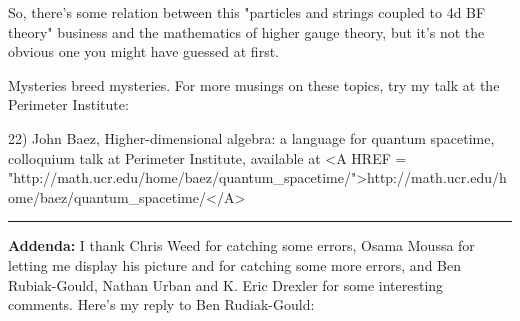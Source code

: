 So, there's some relation between this "particles and strings
coupled to 4d BF theory" business and the mathematics of higher
gauge theory, but it's not the obvious one you might have guessed
at first.

Mysteries breed mysteries.  For more musings on these topics, 
try my talk at the Perimeter Institute:

22) John Baez, Higher-dimensional algebra: a language for quantum
spacetime, colloquium talk at Perimeter Institute,
available at <A HREF = "http://math.ucr.edu/home/baez/quantum_spacetime/">http://math.ucr.edu/home/baez/quantum_spacetime/</A>

\par\noindent\rule{\textwidth}{0.4pt}
\textbf{Addenda:} I thank Chris Weed for catching some errors, Osama
Moussa for letting me display his picture and for
catching some more errors, and Ben Rubiak-Gould, Nathan Urban and 
K. Eric Drexler for some interesting comments.
Here's my reply to Ben Rudiak-Gould:

